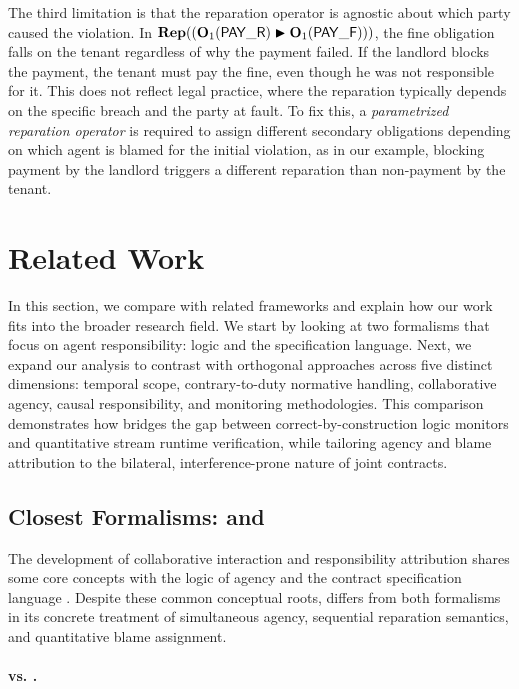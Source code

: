 The third limitation is that the reparation operator is agnostic about which party caused the violation.
In $\repit{(\obl[1]{\PAY} \repair \obl[1]{\PAYF})}$, the fine obligation falls on the tenant regardless of why the payment failed.
If the landlord blocks the payment, the tenant must pay the fine, even though he was not responsible for it.
This does not reflect legal practice, where the reparation typically depends on the specific breach and the party at fault. To fix this, a \emph{parametrized reparation operator} is required to assign different secondary obligations depending on which agent is blamed for the initial violation, as in our example, blocking payment by the landlord triggers a different reparation than non-payment by the tenant.

\section{Related Work}
\label{sec:related-work}
In this section, we compare \cDL with related frameworks and explain how our work fits into the broader research field. We start by looking at two formalisms that focus on agent responsibility:  logic and the  specification language. Next, we expand our analysis to contrast \cDL with orthogonal approaches across five distinct dimensions: temporal scope, contrary-to-duty normative handling, collaborative agency, causal responsibility, and monitoring methodologies. This comparison demonstrates how \cDL bridges the gap between correct-by-construction logic monitors and quantitative stream runtime verification, while tailoring agency and blame attribution to the bilateral, interference-prone nature of joint contracts.
\subsection{Closest Formalisms:  and }
The development of \cDL collaborative interaction and responsibility attribution shares some core concepts with the logic of agency  \cite{belnap2001facing,canavotto2022responsibility} and the contract specification language  \cite{HvitvedKZ12}. Despite these common conceptual roots, \cDL differs from both formalisms in its concrete treatment of simultaneous agency, sequential reparation semantics, and quantitative blame assignment.

\paragraph{\cDL vs. .}

